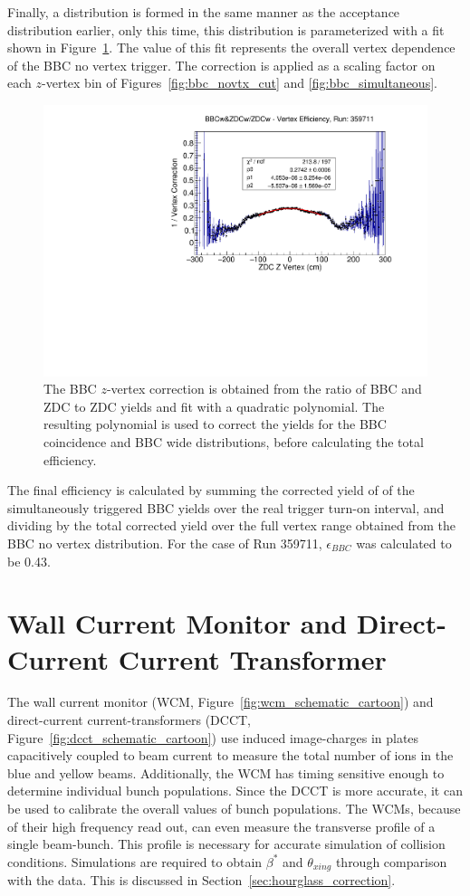 Finally, a distribution is formed in the same manner as the acceptance
distribution earlier, only this time, this distribution is parameterized with a
fit shown in Figure~\ref{fig:vertex_correction}. The value of this fit
represents the overall vertex dependence of the BBC no vertex trigger. The
correction is applied as a scaling factor on each $z$-vertex bin of
Figures~\ref{fig:bbc_novtx_cut} and \ref{fig:bbc_simultaneous}.

\begin{figure}[ht]
  \centering
  \includegraphics[width=0.8\linewidth]{./figures/vertex_correction.pdf}
  \caption{
    The BBC $z$-vertex correction is obtained from the ratio of BBC and ZDC to
    ZDC yields and fit with a quadratic polynomial. The resulting polynomial is
    used to correct the yields for the BBC coincidence and BBC wide
    distributions, before calculating the total efficiency.
  }
  \label{fig:vertex_correction}
\end{figure}

The final efficiency is calculated by summing the corrected yield of of the
simultaneously triggered BBC yields over the real trigger turn-on interval, and
dividing by the total corrected yield over the full vertex range obtained from
the BBC no vertex distribution. For the case of Run 359711, $\epsilon_{BBC}$ was
calculated to be 0.43.

\clearpage
\section{Wall Current Monitor and Direct-Current Current Transformer}

The wall current monitor (WCM, Figure~\ref{fig:wcm_schematic_cartoon}) and
direct-current current-transformers (DCCT,
Figure~\ref{fig:dcct_schematic_cartoon}) use induced image-charges in plates
capacitively coupled to beam current to measure the total number of ions in the
blue and yellow beams. Additionally, the WCM has timing sensitive enough to
determine individual bunch populations. Since the DCCT is more accurate, it can
be used to calibrate the overall values of bunch populations. The WCMs, because
of their high frequency read out, can even measure the transverse profile of a
single beam-bunch. This profile is necessary for accurate simulation of
collision conditions. Simulations are required to obtain $\beta^*$ and
$\theta_{xing}$ through comparison with the data. This is discussed in
Section~\ref{sec:hourglass_correction}.


